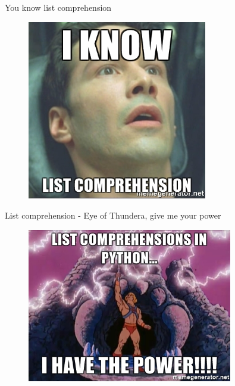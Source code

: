 \documentclass[10pt]{beamer}
\begin{document}
\begin{frame}{You know list comprehension}
\begin{figure}
	\includegraphics[width=0.7\textwidth]{figs/i-know-list-comprehension.jpg}
\end{figure}
\end{frame}

\begin{frame}{List comprehension - Eye of Thundera, give me your power}
\begin{figure}
	\includegraphics[width=0.8\textwidth]{figs/thunderCat.jpg}
\end{figure}
\end{frame}
\end{document}
